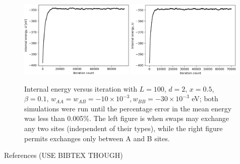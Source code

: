 \documentclass[10pt]{article}
\begin{document}
\begin{figure}[h!]
\centering
\includegraphics[width=0.49\textwidth]{Figures/swap_any_two_convergence.png}
\includegraphics[width=0.49\textwidth]{Figures/swap_A_B_only_convergence.png}
\caption{Internal energy versus iteration with $L=100$, $d=2$, $x=0.5$, $\beta=0.1$, $w_{AA}=w_{AB}=-10 \times 10^{-3},w_{BB} = -30 \times 10^{-3}$ eV; both simulations were run until the percentage error in the mean energy was less than 0.005\%.
The left figure is when swaps may exchange any two sites (independent of their types), while the right figure permits exchanges only between A and B sites.}
\label{fig:swap}
\end{figure}


\newpage

References (USE BIBTEX THOUGH)
\end{document}
